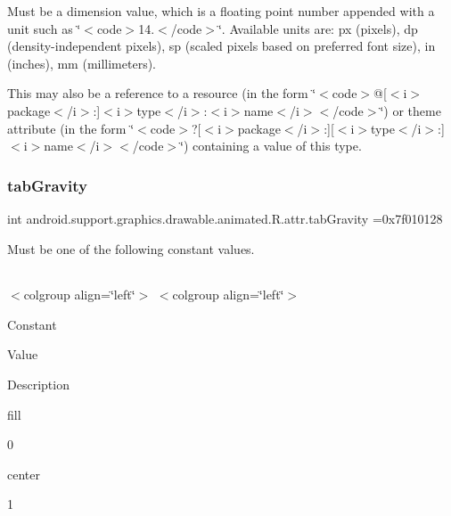 Must be a dimension value, which is a floating point number appended with a unit such as \char`\"{}$<$code$>$14.\+5sp$<$/code$>$\char`\"{}. Available units are\+: px (pixels), dp (density-\/independent pixels), sp (scaled pixels based on preferred font size), in (inches), mm (millimeters). 

This may also be a reference to a resource (in the form \char`\"{}$<$code$>$@\mbox{[}$<$i$>$package$<$/i$>$\+:\mbox{]}$<$i$>$type$<$/i$>$\+:$<$i$>$name$<$/i$>$$<$/code$>$\char`\"{}) or theme attribute (in the form \char`\"{}$<$code$>$?\mbox{[}$<$i$>$package$<$/i$>$\+:\mbox{]}\mbox{[}$<$i$>$type$<$/i$>$\+:\mbox{]}$<$i$>$name$<$/i$>$$<$/code$>$\char`\"{}) containing a value of this type. \mbox{\label{classandroid_1_1support_1_1graphics_1_1drawable_1_1animated_1_1R_1_1attr_ad3d330deb774d9d5e159a7ccd09a8172}} 
\subsubsection{\texorpdfstring{tab\+Gravity}{tabGravity}}
{\footnotesize\ttfamily int android.\+support.\+graphics.\+drawable.\+animated.\+R.\+attr.\+tab\+Gravity =0x7f010128\hspace{0.3cm}{\ttfamily [static]}}

Must be one of the following constant values.

\tabulinesep=1mm
\begin{longtabu} spread 0pt [c]{*{0}{|X[-1]}|}
\hline
\end{longtabu}
$<$colgroup align=\char`\"{}left\char`\"{}$>$ $<$colgroup align=\char`\"{}left\char`\"{}$>$ 

Constant

Value

Description 

{\ttfamily fill}

0

{\ttfamily center}

1\mbox{\label{classandroid_1_1support_1_1graphics_1_1drawable_1_1animated_1_1R_1_1attr_ab732a2053546c7840f04158b82a6b698}} 
